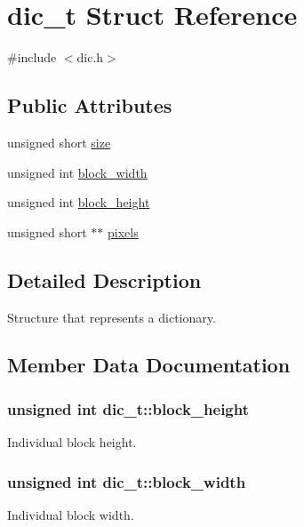 \hypertarget{structdic__t}{}\section{dic\+\_\+t Struct Reference}
\label{structdic__t}


{\ttfamily \#include $<$dic.\+h$>$}

\subsection*{Public Attributes}
\begin{DoxyCompactItemize}
\item 
unsigned short \hyperlink{structdic__t_a5b7a90222befc84c0bb74f31d6df418f}{size}
\item 
unsigned int \hyperlink{structdic__t_aa2655a335e9ce7d79bb0143435a10bf0}{block\+\_\+width}
\item 
unsigned int \hyperlink{structdic__t_a1e29d6ba5a3a91e563d83732bb7064cd}{block\+\_\+height}
\item 
unsigned short $\ast$$\ast$ \hyperlink{structdic__t_ab196d2cfe35a58fb137dd8ab366389dd}{pixels}
\end{DoxyCompactItemize}


\subsection{Detailed Description}
Structure that represents a dictionary. 

\subsection{Member Data Documentation}
\hypertarget{structdic__t_a1e29d6ba5a3a91e563d83732bb7064cd}{}
\subsubsection[{block\+\_\+height}]{\setlength{\rightskip}{0pt plus 5cm}unsigned int dic\+\_\+t\+::block\+\_\+height}\label{structdic__t_a1e29d6ba5a3a91e563d83732bb7064cd}
Individual block height. \hypertarget{structdic__t_aa2655a335e9ce7d79bb0143435a10bf0}{}
\subsubsection[{block\+\_\+width}]{\setlength{\rightskip}{0pt plus 5cm}unsigned int dic\+\_\+t\+::block\+\_\+width}\label{structdic__t_aa2655a335e9ce7d79bb0143435a10bf0}
Individual block width. \hypertarget{structdic__t_ab196d2cfe35a58fb137dd8ab366389dd}{}
